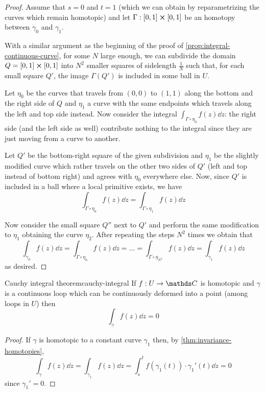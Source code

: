 \documentclass[12pt]{extarticle}
\begin{document}
\begin{proof}
	Assume that $s = 0$ and $t = 1$ (which we can obtain by reparametrizing the curves which remain
	homotopic) and let $\Gamma: [0,1]\cross[0,1]$ be an homotopy between $\gamma_0$ and $\gamma_1$.

	With a similar argument as the beginning of the proof of \cref{prop:integral-continuous-curve},
	for some $N$ large enough, we can subdivide the domain $Q = [0, 1] \cross [0,1]$ into $N^2$
	smaller squares of sidelength $\frac{1}{N}$ such that, for each small square $Q'$, the image
	$\Gamma(Q')$ is included in some ball in $U$.

	Let $\eta_0$ be the curves that travels from $(0,0)$ to $(1,1)$ along the bottom and
	the right side of $Q$ and $\eta_1$ a curve with the same endpoints which travels along the
	left and top side instead.
	Now consider the integral $\int_{\Gamma \circ \eta_0} f(z) \dd z$: the right side (and the
	left side as well) contribute nothing to the integral since they are just moving from a curve to
	another.

	Let $Q'$ be the bottom-right square of the given subdivision and $\eta_1$ be the slightly
	modified curve which rather travels on the other two sides of $Q'$ (left and top instead of bottom
	right) and agrees with $\eta_0$ everywhere else.
	Now, since $Q'$ is included in a ball where a local primitive exists, we have
	\begin{equation}
		\int_{\Gamma \circ \eta_0} f(z) \dd z = \int_{\Gamma \circ \eta_1} f(z) \dd z
	\end{equation}

	Now consider the small square $Q''$ next to $Q'$ and perform the same modification to $\eta_1$
	obtaining the curve $\eta_2$. After repeating the steps $N^2$ times we obtain that
	\begin{equation}
		\int_{\gamma_0} f(z) \dd z = \int_{\Gamma \circ \eta_0} f(z) \dd z = \dots =
		\int_{\Gamma \circ \eta_{N^2}} f(z) \dd z = \int_{\gamma_1} f(z) \dd z
	\end{equation}
	as desired.
\end{proof}

\begin{theorem}{Cauchy integral theorem}{cauchy-integral}
	If $f : U \to \C$ is homotopic and $\gamma$ is a continuous loop which can be continuously
	deformed into a point (among loops in $U$) then
	\begin{equation}
		\int_\gamma f(z) \dd z = 0
	\end{equation}
\end{theorem}
\begin{proof}
	If $\gamma$ is homotopic to a constant curve $\gamma_1$ then, by \cref{thm:invariance-homotopies},
	\begin{equation}
		\int_\gamma f(z) \dd z = \int_{\gamma_1} f(z) \dd z =
		\int_s^t f(\gamma_1(t)) \cdot \gamma_1'(t) \dd z = 0
	\end{equation}
	since $\gamma_1' = 0$.
\end{proof}
\end{document}
